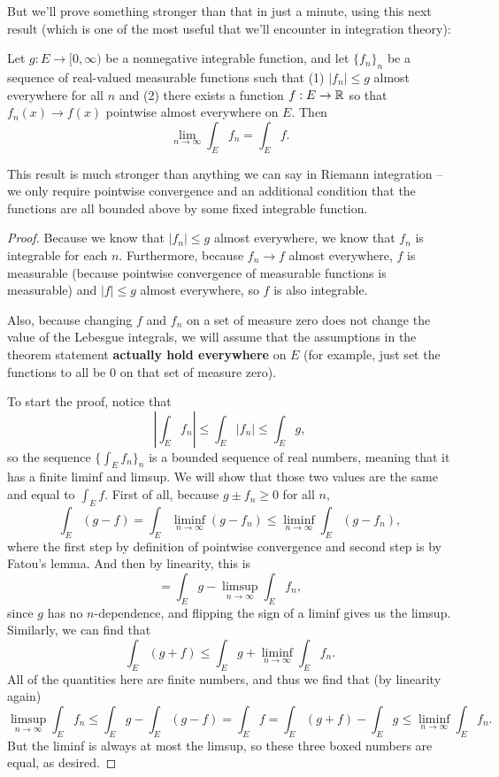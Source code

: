 But we'll prove something stronger than that in just a minute, using this next result (which is one of the most useful that we'll encounter in integration theory):

\begin{theorem}
Let $g: E \to [0, \infty)$ be a nonnegative integrable function, and let $\{f_n\}_n$ be a sequence of real-valued measurable functions such that (1) $|f_n| \le g$ almost everywhere for all $n$ and (2) there exists a function $f: E \to \mathbb R$ so that $f_n(x) \to f(x)$ pointwise almost everywhere on $E$. Then 
\[
    \lim_{n \to \infty} \int_E f_n = \int_E f. 
\]
\end{theorem}

This result is much stronger than anything we can say in Riemann integration -- we only require pointwise convergence and an additional condition that the functions are all bounded above by some fixed integrable function.

\begin{proof}
Because we know that $|f_n| \le g$ almost everywhere, we know that $f_n$ is integrable for each $n$. Furthermore, because $f_n \to f$ almost everywhere, $f$ is measurable (because pointwise convergence of measurable functions is measurable) and $|f| \le g$ almost everywhere, so $f$ is also integrable. 

Also, because changing $f$ and $f_n$ on a set of measure zero does not change the value of the Lebesgue integrals, we will assume that the assumptions in the theorem statement \textbf{actually hold everywhere} on $E$ (for example, just set the functions to all be $0$ on that set of measure zero).

To start the proof, notice that 
\[
    \left|\int_E f_n\right| \le \int_E |f_n| \le \int_E g,
\]
so the sequence $\{\int_E f_n\}_n$ is a bounded sequence of real numbers, meaning that it has a finite liminf and limsup. We will show that those two values are the same and equal to $\int_E f$. First of all, because $g \pm f_n \ge 0$ for all $n$, 
\[
    \int_E (g-f) = \int_E \liminf_{n \to \infty} (g-f_n) \le \liminf_{n \to \infty} \int_E (g - f_n),
\]
where the first step by definition of pointwise convergence and second step is by Fatou's lemma. And then by linearity, this is 
\[
    = \int_E g - \limsup_{n \to \infty} \int_E f_n,
\]
since $g$ has no $n$-dependence, and flipping the sign of a liminf gives us the limsup. Similarly, we can find that 
\[
    \int_E (g+f) \le \int_E g + \liminf_{n \to \infty} \int_E f_n.
\]
All of the quantities here are finite numbers, and thus we find that (by linearity again)
\[
    \boxed{\limsup_{n \to \infty} \int_E f_n }\le \int_E g - \int_E (g-f) = \boxed{\int_E f}= \int_E (g+f) - \int_E g \le \boxed{\liminf_{n \to \infty} \int_E f_n}.
\]
But the liminf is always at most the limsup, so these three boxed numbers are equal, as desired.
\end{proof}

